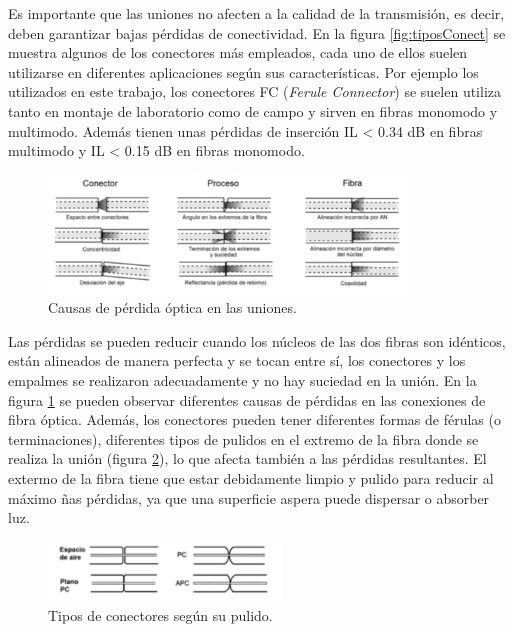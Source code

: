 \begin{itemize}
 		Es importante que las uniones no afecten a la calidad de la transmisión, es decir, deben garantizar bajas pérdidas de conectividad. En la figura \ref{fig:tiposConect} se muestra algunos de los conectores más empleados, cada uno de ellos suelen utilizarse en diferentes aplicaciones según sus características. Por ejemplo los utilizados en este trabajo, los conectores FC (\textit{Ferule Connector}) se suelen utiliza tanto en montaje de laboratorio como de campo y sirven en fibras monomodo y multimodo. Además tienen unas pérdidas de inserción IL < 0.34 dB en fibras multimodo y IL < 0.15 dB en fibras monomodo. \cite{TipConectoresFO}\\
 		\begin{figure}[H]
	 		\centering
	 		\includegraphics[width=0.85\textwidth]{./img/perdidasOpticas}
	 		\caption{Causas de pérdida óptica en las uniones. \cite{FOAconect}} 
	 		\label{fig:conectLoss}
 		\end{figure}
 		Las pérdidas se pueden reducir cuando los núcleos de las dos fibras son idénticos, están alineados de manera perfecta y se tocan entre sí, los conectores y los empalmes se realizaron adecuadamente y no hay suciedad en la unión. En la figura \ref{fig:conectLoss} se pueden observar diferentes causas de pérdidas en las conexiones de fibra óptica. Además, los conectores pueden tener diferentes formas de férulas (o terminaciones), diferentes tipos de pulidos en el extremo de la fibra donde se realiza la unión (figura \ref{fig:tiposPulidos}), lo que afecta también a las pérdidas resultantes. El extermo de la fibra tiene que estar debidamente limpio y pulido para reducir al máximo ñas pérdidas, ya que una superficie aspera puede dispersar o absorber luz.		
   		\begin{figure}[H]
   			\centering
   			\includegraphics[width=0.55\textwidth]{./img/conectoresPulido}
   			\caption{Tipos de conectores según su pulido. \cite{TipConectoresFO}} 
   			\label{fig:tiposPulidos}
   		\end{figure}


\end{itemize}
